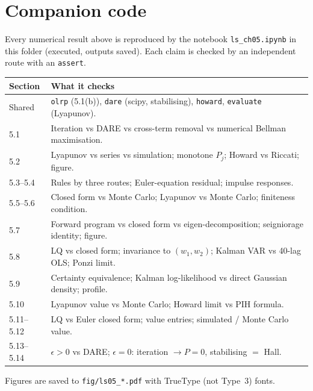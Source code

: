 \documentclass[12pt, letterpaper]{article}
\begin{document}
\section*{Companion code}

Every numerical result above is reproduced by the notebook \texttt{ls\_ch05.ipynb} in this folder
(executed, outputs saved). Each claim is checked by an independent route with an \texttt{assert}.

\begin{center}
\begin{tabular}{@{}lp{11.2cm}@{}}
\toprule
\textbf{Section} & \textbf{What it checks} \\
\midrule
Shared & \texttt{olrp} (5.1(b)), \texttt{dare} (scipy, stabilising), \texttt{howard}, \texttt{evaluate} (Lyapunov). \\
5.1 & Iteration vs DARE vs cross-term removal vs numerical Bellman maximisation. \\
5.2 & Lyapunov vs series vs simulation; monotone $P_j$; Howard vs Riccati; figure. \\
5.3--5.4 & Rules by three routes; Euler-equation residual; impulse responses. \\
5.5--5.6 & Closed form vs Monte Carlo; Lyapunov vs Monte Carlo; finiteness condition. \\
5.7 & Forward program vs closed form vs eigen-decomposition; seigniorage identity; figure. \\
5.8 & LQ vs closed form; invariance to $(w_1,w_2)$; Kalman VAR vs 40-lag OLS; Ponzi limit. \\
5.9 & Certainty equivalence; Kalman log-likelihood vs direct Gaussian density; profile. \\
5.10 & Lyapunov value vs Monte Carlo; Howard limit vs PIH formula. \\
5.11--5.12 & LQ vs Euler closed form; value entries; simulated / Monte Carlo value. \\
5.13--5.14 & $\epsilon>0$ vs DARE; $\epsilon=0$: iteration $\to P=0$, stabilising $=$ Hall. \\
\bottomrule
\end{tabular}
\end{center}

Figures are saved to \texttt{fig/ls05\_*.pdf} with TrueType (not Type~3) fonts.
\end{document}
